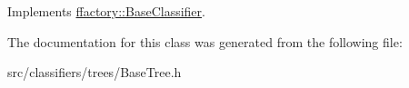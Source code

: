 Implements \hyperlink{classffactory_1_1_base_classifier_a150000cb5cd9b2bb4380b47f33a462f2}{ffactory\-::\-Base\-Classifier}.



The documentation for this class was generated from the following file\-:\begin{DoxyCompactItemize}
\item 
src/classifiers/trees/Base\-Tree.\-h\end{DoxyCompactItemize}
